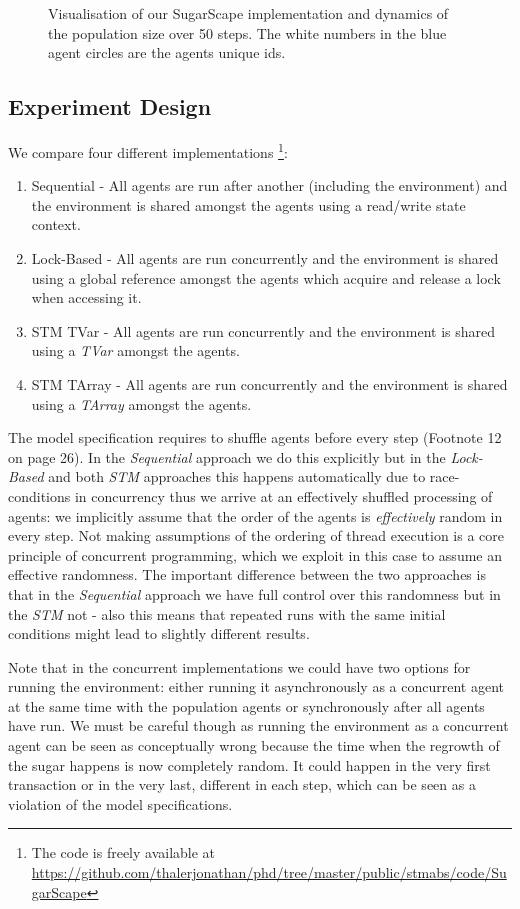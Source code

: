 \begin{figure}
\begin{center}
	\caption{Visualisation of our SugarScape implementation and dynamics of the population size over 50 steps. The white numbers in the blue agent circles are the agents unique ids.}
	\label{fig:vis_sugarscape}
\end{center}
\end{figure}

\subsection{Experiment Design}
We compare four different implementations \footnote{The code is freely available at \url{https://github.com/thalerjonathan/phd/tree/master/public/stmabs/code/SugarScape}}:

\begin{enumerate}
	\item Sequential - All agents are run after another (including the environment) and the environment is shared amongst the agents using a read/write state context.
	\item Lock-Based - All agents are run concurrently and the environment is shared using a global reference amongst the agents which acquire and release a lock when accessing it.
	\item STM TVar - All agents are run concurrently and the environment is shared using a \textit{TVar} amongst the agents.
	\item STM TArray - All agents are run concurrently and the environment is shared using a \textit{TArray} amongst the agents. 
\end{enumerate}

The model specification requires to shuffle agents before every step (Footnote 12 on page 26). In the \textit{Sequential} approach we do this explicitly but in the \textit{Lock-Based} and both \textit{STM} approaches this happens automatically due to race-conditions in concurrency thus we arrive at an effectively shuffled processing of agents: we implicitly assume that the order of the agents is \textit{effectively} random in every step. Not making assumptions of the ordering of thread execution is a core principle of concurrent programming, which we exploit in this case to assume an effective randomness. The important difference between the two approaches is that in the \textit{Sequential} approach we have full control over this randomness but in the \textit{STM} not - also this means that repeated runs with the same initial conditions might lead to slightly different results.

Note that in the concurrent implementations we could have two options for running the environment: either running it asynchronously as a concurrent agent at the same time with the population agents or synchronously after all agents have run. We must be careful though as running the environment as a concurrent agent can be seen as conceptually wrong because the time when the regrowth of the sugar happens is now completely random. It could happen in the very first transaction or in the very last, different in each step, which can be seen as a violation of the model specifications.

